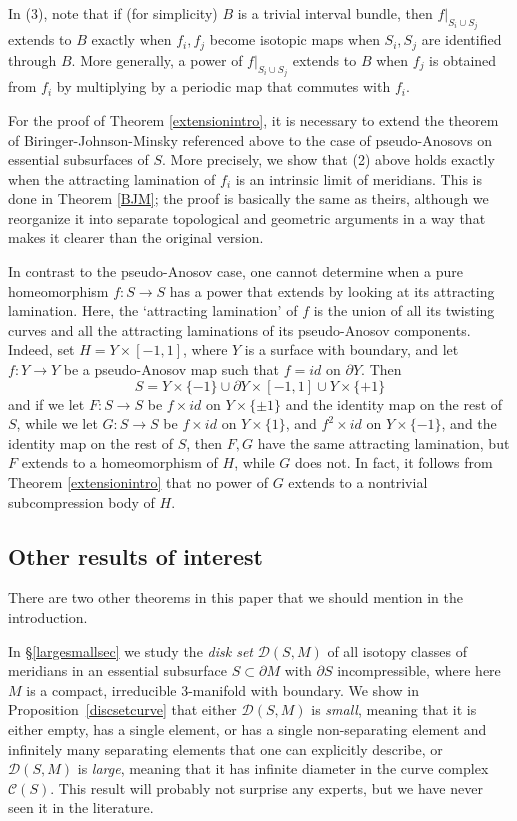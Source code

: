 \documentclass[12pt]{amsart}
\theoremstyle{definition}
\theoremstyle{remark}
\begin{document}
In (3), note that if (for simplicity) $B$ is a trivial interval bundle, then $f|_{S_i\cup S_j}$ extends to $B$ exactly when $f_i,f_j$ become isotopic maps when $S_i,S_j$ are identified through  $B$. More generally, a power of $f|_{S_i\cup S_j}$ extends to $B$ when $f_j$ is obtained from $f_i$ by multiplying by a periodic map that commutes with $f_i$.

For the proof of Theorem \ref{extensionintro}, it is necessary to extend the theorem of Biringer-Johnson-Minsky \cite{Biringerextending} referenced above to the case of pseudo-Anosovs on essential subsurfaces of $S$. More precisely, we show that (2) above holds exactly when the attracting lamination of $f_i$ is an intrinsic limit of meridians. This is done in Theorem \ref{BJM}; the proof is basically the same as theirs, although we reorganize it into separate topological and geometric arguments in a way that makes it clearer than the original version. 

In contrast to the pseudo-Anosov case, one cannot determine when a pure homeomorphism $f: S \longrightarrow S $ has a power that extends by looking at its attracting lamination. Here, the `attracting lamination' of $f$ is the union of all its twisting curves and all the attracting laminations of its pseudo-Anosov components. Indeed, set $H=Y \times [-1,1]$, where $Y$ is a surface with boundary, and let $f : Y \longrightarrow Y$ be a pseudo-Anosov map such that $f=id$ on $\partial Y$. Then $$S = Y \times \{-1\} \cup \partial Y \times [-1,1] \cup Y \times \{+1\}$$
and if we let $F : S\longrightarrow S$ be $f\times id$ on $Y\times \{\pm 1\}$ and the identity map on the rest of $S$, while we let $G : S \longrightarrow S$ be $f\times id$ on $Y \times \{1\}$, and $f^2\times id$ on $Y \times \{-1\}$, and the identity map on the rest of $S$, then $F,G$ have the same attracting lamination, but $F$ extends to a homeomorphism of $H$, while $G$ does not. In fact, it follows from Theorem \ref{extensionintro} that no power of $G$ extends to a nontrivial subcompression body of $H$. 

\subsection{Other results of interest}

There are two other theorems in this paper that we should mention in the introduction.  

In \S\ref{largesmallsec} we study the \emph{disk set} $\mathcal D(S,M)$ of all isotopy classes of meridians in an essential subsurface $S \subset \partial M$ with $\partial S$ incompressible, where here $M$ is a compact, irreducible $3$-manifold with boundary. We show in Proposition~\ref{discsetcurve} that either $\mathcal D(S,M)$ is \emph{small}, meaning that it is either empty, has a single element, or has a single non-separating element and infinitely many separating elements that one can explicitly describe, or $\mathcal D(S,M)$ is \emph{large}, meaning that it has infinite diameter in the curve complex $\mathcal C(S)$. This result will probably not surprise any experts, but we have never seen it in the literature.
\end{document}
